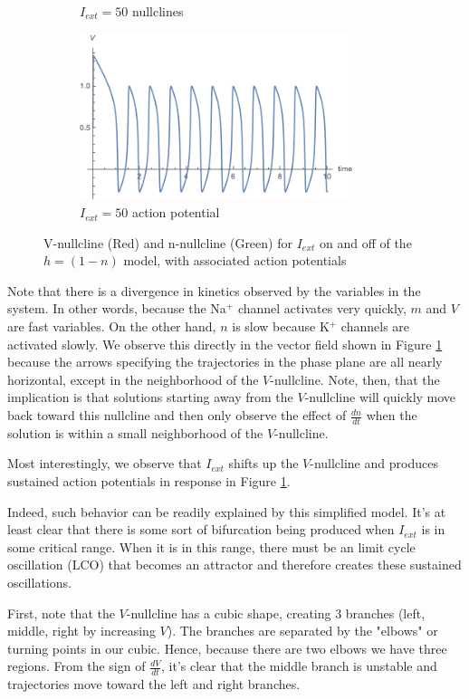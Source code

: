 \documentclass{article}
\begin{document}
\begin{figure}
\begin{subfigure}{\textwidth}
	\caption{$I_{ext}=50$ nullclines}
\end{subfigure}
\begin{subfigure}{\textwidth}
	\centering
	\includegraphics[width=8cm]{sustained_simple.png}
	\caption{$I_{ext}=50$ action potential}
\end{subfigure}
	\caption{V-nullcline (Red) and n-nullcline (Green) for $I_{ext}$ on and off of the $h=(1-n)$ model, with associated action potentials}
	\label{fig:nullc}
\end{figure}

Note that there is a divergence in kinetics observed by the variables in the system. In other words, because the Na$^+$ channel activates very quickly, $m$ and $V$ are fast variables. On the other hand, $n$ is slow because K$^+$ channels are activated slowly.\cite{keener} We observe this directly in the vector field shown in Figure \ref{fig:nullc} because the arrows specifying the trajectories in the phase plane are all nearly horizontal, except in the neighborhood of the $V$-nullcline. Note, then, that the implication is that solutions starting away from the $V$-nullcline will quickly move back toward this nullcline and then only observe the effect of $\frac{dn}{dt}$ when the solution is within a small neighborhood of the $V$-nullcline. 

Most interestingly, we observe that $I_{ext}$ shifts up the $V$-nullcline and produces sustained action potentials in response in Figure \ref{fig:nullc}.

Indeed, such behavior can be readily explained by this simplified model. It's at least clear that there is some sort of bifurcation being produced when $I_{ext}$ is in some critical range. When it is in this range, there must be an limit cycle oscillation (LCO) that becomes an attractor and therefore creates these sustained oscillations. 

First, note that the $V$-nullcline has a cubic shape, creating 3 branches (left, middle, right by increasing $V$). The branches are separated by the "elbows" or turning points in our cubic. Hence, because there are two elbows we have three regions. From the sign of $\frac{dV}{dt}$, it's clear that the middle branch is unstable and trajectories move toward the left and right branches.
\end{document}
